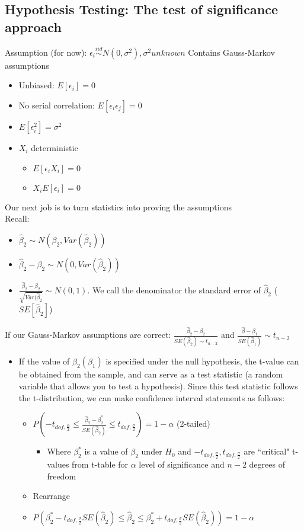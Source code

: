 \documentclass[10pt, oneside]{article}
\begin{document}
\subsection{Hypothesis Testing: The test of significance approach}
Assumption (for now): $\epsilon_i \overset{iid}{\sim} N(0, \sigma^2), \sigma^2 unknown$
Contains Gauss-Markov assumptions
\begin{itemize}
    \item Unbiased: $E[\epsilon_i] = 0$
    \item No serial correlation: $E[\epsilon_i\epsilon_j] = 0$
    \item $E[\epsilon_i ^2] = \sigma^2$
    \item $X_i$ deterministic
    \begin{itemize}
        \item $E[\epsilon_i X_i ] = 0$
        \item $X_i E[\epsilon_i] = 0$
    \end{itemize}
\end{itemize}
Our next job is to turn statistics into proving the assumptions\\
Recall:
\begin{itemize}
    \item $\hat \beta_2 \sim N(\beta_2, Var(\hat \beta_2))$
    \item $\hat \beta_2 - \beta_2 \sim N(0, Var(\hat \beta_2))$
    \item $\frac{\hat \beta_2 - \beta_2}{\sqrt{Var(\hat \beta_2}} \sim N(0,1)$. We call the denominator the standard error of $\hat \beta_2$ ($SE[\hat \beta_2]$)
\end{itemize}
If our Gauss-Markov assumptions are correct: $\frac{\hat \beta_2 - \beta_2}{SE(\hat \beta_2) \sim t_{n-2}}$ and $\frac{\hat \beta - \beta_1}{SE(\hat \beta_1)} \sim t_{n-2}$
\begin{itemize}
    \item If the value of $\beta_2 (\beta_1)$ is specified under the null hypothesis, the t-value can be obtained from the sample, and can serve as a test statistic (a random variable that allows you to test a hypothesis). Since this test statistic follows the t-distribution, we can make confidence interval statements as follows:
    \begin{itemize}
        \item $P\left(-t_{dof, \frac{\alpha}{2}} \leq \frac{\hat \beta_2 - \beta^*_2}{SE(\hat \beta_2)}\leq t_{dof, \frac{\sigma}{2}}\right) = 1- \alpha$ (2-tailed)
        \begin{itemize}
            \item Where $\beta_2^*$ is a value of $\beta_2$ under $H_0$ and $-t_{dof, \frac{\sigma}{2}}, t_{dof, \frac{\sigma}{2}}$ are ``critical" t-values from t-table for $\alpha$ level of significance and $n-2$ degrees of freedom
        \end{itemize}
        \item Rearrange
        \item $P\left(\beta^*_2 - t_{dof, \frac{\sigma}{2}} SE(\hat \beta_2 ) \leq \hat \beta_2 \leq \beta_2 ^* + t_{dof, \frac{\sigma}{2}} SE(\hat \beta_2)\right) = 1-\alpha$
    \end{itemize}
\end{itemize}
\end{document}
